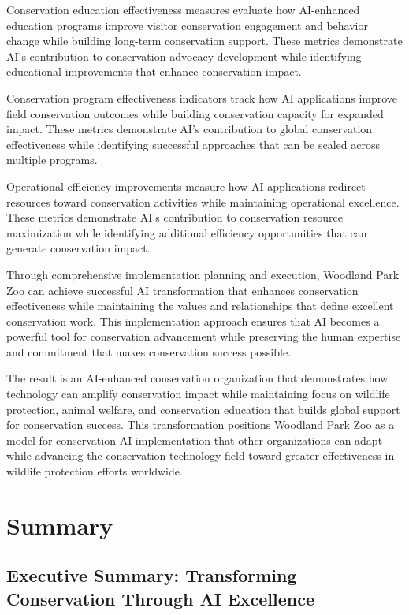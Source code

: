 \documentclass[
  Letterpaper,
]{scrbook}
\begin{document}
Conservation education effectiveness measures evaluate how AI-enhanced
education programs improve visitor conservation engagement and behavior
change while building long-term conservation support. These metrics
demonstrate AI's contribution to conservation advocacy development while
identifying educational improvements that enhance conservation impact.

Conservation program effectiveness indicators track how AI applications
improve field conservation outcomes while building conservation capacity
for expanded impact. These metrics demonstrate AI's contribution to
global conservation effectiveness while identifying successful
approaches that can be scaled across multiple programs.

Operational efficiency improvements measure how AI applications redirect
resources toward conservation activities while maintaining operational
excellence. These metrics demonstrate AI's contribution to conservation
resource maximization while identifying additional efficiency
opportunities that can generate conservation impact.

Through comprehensive implementation planning and execution, Woodland
Park Zoo can achieve successful AI transformation that enhances
conservation effectiveness while maintaining the values and
relationships that define excellent conservation work. This
implementation approach ensures that AI becomes a powerful tool for
conservation advancement while preserving the human expertise and
commitment that makes conservation success possible.

The result is an AI-enhanced conservation organization that demonstrates
how technology can amplify conservation impact while maintaining focus
on wildlife protection, animal welfare, and conservation education that
builds global support for conservation success. This transformation
positions Woodland Park Zoo as a model for conservation AI
implementation that other organizations can adapt while advancing the
conservation technology field toward greater effectiveness in wildlife
protection efforts worldwide.


\chapter*{Summary}\label{summary}


\section*{Executive Summary: Transforming Conservation Through AI
Excellence}\label{executive-summary-transforming-conservation-through-ai-excellence}
\end{document}
